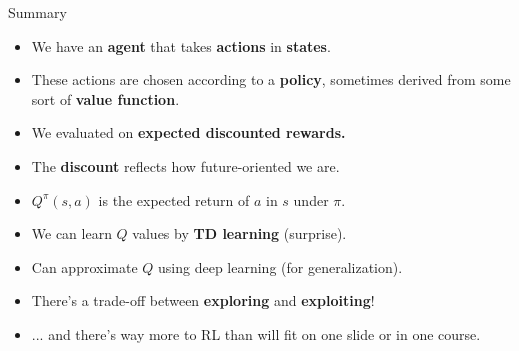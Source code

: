 \documentclass{beamer} %
\begin{document}
\begin{frame}{Summary}
\begin{itemize}
\item We have an \textbf{agent} that takes \textbf{actions} in \textbf{states}. 
\item<2-> These actions are chosen according to a \textbf{policy}, sometimes derived from some sort of \textbf{value function}. 
\item<3-> We evaluated on \textbf{expected discounted rewards.}
\item<4-> The \textbf{discount} reflects how future-oriented we are.
\item<5-> \(Q^\pi(s,a)\) is the expected return of \(a\) in \(s\) under \(\pi\).
\item<6-> We can learn \(Q\) values by \textbf{TD learning} (surprise).
\item<7-> Can approximate \(Q\) using deep learning (for generalization). 
\item<8-> There's a trade-off between \textbf{exploring} and \textbf{exploiting}!
\item<9-> ... and there's way more to RL than will fit on one slide or in one course.
\end{itemize}
\end{frame}
\end{document}
